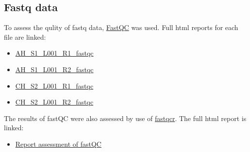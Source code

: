 \documentclass{article}
\begin{document}
\subsection{Fastq data}
\label{fastq_data}
To assess the qulity of fastq data, \href{https://www.bioinformatics.babraham.ac.uk/projects/fastqc/}{FastQC} was used. 
Full html reports for each file are linked:
\begin{itemize}
	\item \href{https://lawlessgenomics.com/pages/sophia/AH_S1_L001_R1_fastqc.html}{AH\_S1\_L001\_R1\_fastqc}
	\item \href{https://lawlessgenomics.com/pages/sophia/AH_S1_L001_R2_fastqc.html}{AH\_S1\_L001\_R2\_fastqc}
	\item \href{https://lawlessgenomics.com/pages/sophia/CH_S2_L001_R1_fastqc.html}{CH\_S2\_L001\_R1\_fastqc}
	\item \href{https://lawlessgenomics.com/pages/sophia/CH_S2_L001_R2_fastqc.html}{CH\_S2\_L001\_R2\_fastqc}
\end{itemize}

The results of fastQC were also assessed by use of \href{https://rpkgs.datanovia.com/fastqcr/index.html}{fastqcr}.
The full html report is linked:
\begin{itemize}
	\item \href{https://lawlessgenomics.com/pages/sophia/qc_report.html}{Report assessment of fastQC}
\end{itemize}
\end{document}
